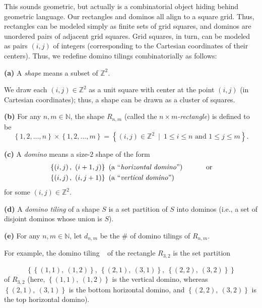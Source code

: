 This sounds geometric, but actually is a combinatorial object hiding behind
geometric language. Our rectangles and dominos all align to a square grid.
Thus, rectangles can be modeled simply as finite sets of grid squares, and
dominos are unordered pairs of adjacent grid squares. Grid squares, in turn,
can be modeled as pairs $\left(  i,j\right)  $ of integers (corresponding to
the Cartesian coordinates of their centers). Thus, we redefine domino tilings
combinatorially as follows:

\begin{definition}
\label{def.domino.shapes-and-tilings}\textbf{(a)} A \emph{shape} means a
subset of $\mathbb{Z}^{2}$.

We draw each $\left(  i,j\right)  \in\mathbb{Z}^{2}$ as a unit square with
center at the point $\left(  i,j\right)  $ (in Cartesian coordinates); thus, a
shape can be drawn as a cluster of squares. \medskip

\textbf{(b)} For any $n,m\in\mathbb{N}$, the shape $R_{n,m}$ (called the
$n\times m$\emph{-rectangle}) is defined to be%
\[
\left\{  1,2,\ldots,n\right\}  \times\left\{  1,2,\ldots,m\right\}  =\left\{
\left(  i,j\right)  \in\mathbb{Z}^{2}\ \mid\ 1\leq i\leq n\text{ and }1\leq
j\leq m\right\}  .
\]


\textbf{(c)} A \emph{domino} means a size-$2$ shape of the form%
\begin{align*}
&  \left\{  \left(  i,j\right)  ,\ \left(  i+1,j\right)  \right\}  \text{ (a
\textquotedblleft\emph{horizontal domino}\textquotedblright)}%
\ \ \ \ \ \ \ \ \ \ \text{or}\\
&  \left\{  \left(  i,j\right)  ,\ \left(  i,j+1\right)  \right\}  \text{ (a
\textquotedblleft\emph{vertical domino}\textquotedblright)}%
\end{align*}
for some $\left(  i,j\right)  \in\mathbb{Z}^{2}$. \medskip

\textbf{(d)} A \emph{domino tiling} of a shape $S$ is a set partition of $S$
into dominos (i.e., a set of disjoint dominos whose union is $S$). \medskip

\textbf{(e)} For any $n,m\in\mathbb{N}$, let $d_{n,m}$ be the \# of domino
tilings of $R_{n,m}$.
\end{definition}

For example, the domino tiling $\raisebox{-3.5ex}{
}$ of the rectangle $R_{3,2}$ is the set partition%
\[
\left\{  \left\{  \left(  1,1\right)  ,\ \left(  1,2\right)  \right\}
,\ \left\{  \left(  2,1\right)  ,\ \left(  3,1\right)  \right\}  ,\ \left\{
\left(  2,2\right)  ,\ \left(  3,2\right)  \right\}  \right\}
\]
of $R_{3,2}$ (here, $\left\{  \left(  1,1\right)  ,\ \left(  1,2\right)
\right\}  $ is the vertical domino, whereas $\left\{  \left(  2,1\right)
,\ \left(  3,1\right)  \right\}  $ is the bottom horizontal domino, and
$\left\{  \left(  2,2\right)  ,\ \left(  3,2\right)  \right\}  $ is the top
horizontal domino). \medskip

